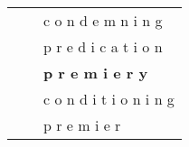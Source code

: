 \documentclass[11pt]{article}
\begin{document}
\begin{spacing}{1}
\begin{table}[!htpb]
\begin{tabular}{p{8cm} l p{5cm}}
                                                                                 &                 & c o n d e m n i n g                                                                                                                                                                                                                                                                                                                                                                                             \\
                                                                                 &                 & p r e d i c a t i o n                                                                                                                                                                                                                                                                                                                                                                                           \\
                                                                                 &                 & \textbf{p r e m i e r y}                                                                                                                                                                                                                                                                                                                                                                                                 \\
                                                                                 &                 & c o n d i t i o n i n g                                                                                                                                                                                                                                                                                                                                                                                         \\
                                                                                 &                 & p r e m i e r                                                                                                                                                                                                                                                                                                                                                                                                   \\

\end{tabular}
\end{table}
\end{spacing}
\end{document}
